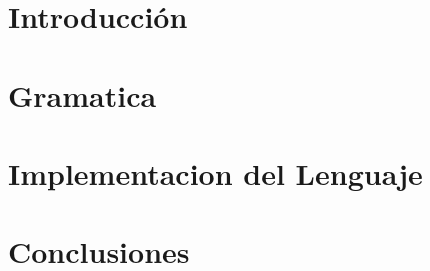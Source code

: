 \documentclass[10pt, a4paper]{article}
\begin{document}

\tableofcontents
\pagebreak
\section{Introducción}

\pagebreak
\section{Gramatica}

\pagebreak
\section{Implementacion del Lenguaje}	

\pagebreak
\section{Conclusiones}	
	
  
\end{document}
